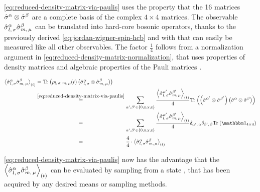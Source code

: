 \autoref{eq:reduced-density-matrix-via-paulis} uses the property that the 16 matrices $\pauli{$\alpha$}\otimes\pauli{$\beta$}$ are a complete basis of the complex $4\times 4$ matrices.
The observable $\pauli[l,\,\sigma]{$\alpha$}\pauli[m,\,\mu]{$\beta$}$ can be translated into hard-core bosonic operators, thanks to the previously derived \autoref{eq:jordan-wigner-spin-hcb} and with that can easily be measured like all other observables.
The factor $\frac{1}{4}$ follows from a normalization argument in \autoref{eq:reduced-density-matrix-normalization}, that uses properties of density matrices \cite{partialTraceEntanglementOfSubsystemsBlochVector} and algebraic properties of the Pauli matrices \cite{pauliPropertiesAndBlochVector}.

\begin{equation}
    \label{eq:reduced-density-matrix-normalization}
    \begin{split}
        \timeExpectationVal{ \pauli[l,\,\sigma]{$\alpha$}\pauli[m,\,\mu]{$\beta$} } &= \partialTrace{}{\rho_{l,\,\sigma,\,m,\,\mu} (t) \left(\pauli[l,\,\sigma]{$\alpha$}\otimes\pauli[m,\,\mu]{$\beta$}\right)}  \\
        &\stackrel{\ref{eq:reduced-density-matrix-via-paulis}}{=}\sum\limits_{\alpha',\beta'\in\left\{0,\text{x},\text{y},\text{z}\right\}} \frac{{\timeExpectationVal{ \pauli[l,\,\sigma]{$\alpha'$}\pauli[m,\,\mu]{$\beta'$} }}}{4}
        \partialTrace{}{\left(\pauli{$\alpha'$}\otimes\pauli{$\beta'$}\right)\left(\pauli{$\alpha$}\otimes\pauli{$\beta$}\right)}\\
        &\stackrel{\phantom{\ref{eq:reduced-density-matrix-via-paulis}}}{=}\sum\limits_{\alpha',\beta'\in\left\{0,\text{x},\text{y},\text{z}\right\}} \frac{\timeExpectationVal{ \pauli[l,\,\sigma]{$\alpha'$}\pauli[m,\,\mu]{$\beta'$} }}{4}
        \delta_{\alpha',\,\alpha}\delta_{\beta',\,\beta}\partialTrace{}{\one[4\times 4]}\\
        &\stackrel{\phantom{\ref{eq:reduced-density-matrix-via-paulis}}}{=}\frac{4}{4} \cdot \timeExpectationVal{ \pauli[l,\,\sigma]{$\alpha$}\pauli[m,\,\mu]{$\beta$} }
    \end{split}
\end{equation}

\autoref{eq:reduced-density-matrix-via-paulis} now has the advantage that the $\timeExpectationVal{ \pauli[l,\,\sigma]{$\alpha$}\pauli[m,\,\mu]{$\beta$} }$ can be evaluated by sampling from a state \psiOfT, that has been acquired by any desired means or sampling methods.

